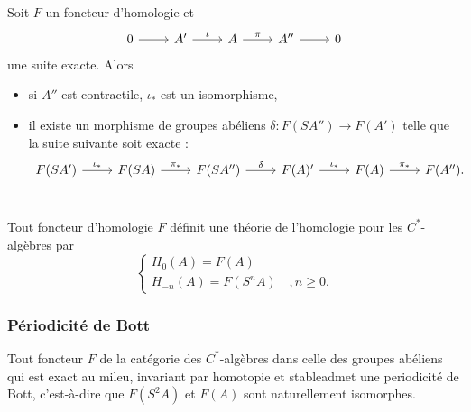 \begin{prop}
Soit $F$ un foncteur d'homologie et \[\begin{tikzcd}
0\arrow{r} & A' \arrow{r}{\iota} & A \arrow{r}{\pi} & A'' \arrow{r} & 0
\end{tikzcd}\]
une suite exacte. Alors 
\begin{itemize}
\item si $A''$ est contractile, $ \iota_*$ est un isomorphisme,
\item il existe un morphisme de groupes abéliens $\delta : F(SA'')\rightarrow F(A')$ telle que la suite suivante soit exacte :
\[\begin{tikzcd}
F(SA') \arrow{r}{\iota_*} & F(SA) \arrow{r}{\pi_*} & F(SA'') \arrow{r}{\delta} & F(A)' \arrow{r}{\iota_*} & F(A) \arrow{r}{\pi_*} & F(A'').\\
\end{tikzcd}\] 
\end{itemize}
\end{prop}

\begin{cor}Tout foncteur d'homologie $F$ définit une théorie de l'homologie pour les $C^*$-algèbres par 
\[\left\{\begin{array}{c} H_0(A)=F(A) \\ H_{-n}(A) = F(S^n A)\quad, n\geq 0.\end{array}\right.\]
\end{cor}

\subsubsection{Périodicité de Bott}

\begin{thm}Tout foncteur $F$ de la catégorie des $C^*$-algèbres dans celle des groupes abéliens qui est exact au mileu, invariant par homotopie et stableadmet une periodicité de Bott, c'est-à-dire que $F(S^2 A)$ et $F(A)$ sont naturellement isomorphes.\end{thm}
